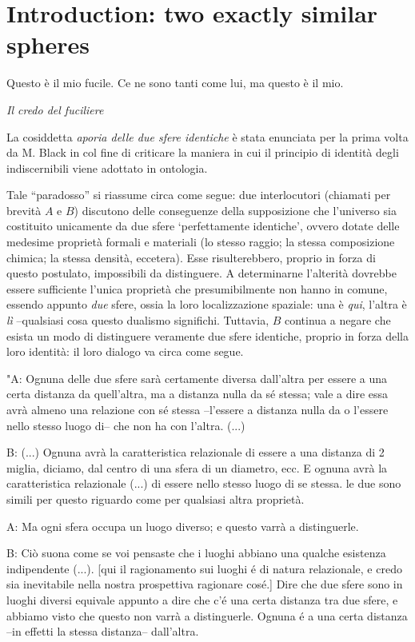 \section{Introduction: two exactly similar spheres}
\epigraph{%
  Questo è il mio fucile. Ce ne sono tanti come lui, ma questo è il mio.
}{\emph{Il credo del fuciliere}}

La cosiddetta \emph{aporia delle due sfere identiche} è stata enunciata per la prima volta da M. Black in \cite{foo} col fine di criticare la maniera in cui il principio di identità degli indiscernibili viene adottato in ontologia.

Tale ``paradosso'' si riassume circa come segue: due interlocutori (chiamati per brevità $A$ e $B$) discutono delle conseguenze della supposizione che l'universo sia costituito unicamente da due sfere `perfettamente identiche', ovvero dotate delle medesime proprietà formali e materiali (lo stesso raggio; la stessa composizione chimica; la stessa densità, eccetera). Esse risulterebbero, proprio in forza di questo postulato, impossibili da distinguere. A determinarne l'alterità dovrebbe essere sufficiente l'unica proprietà che presumibilmente non hanno in comune, essendo appunto \emph{due} sfere, ossia la loro localizzazione spaziale: una è \emph{qui}, l'altra è \emph{lì} --qualsiasi cosa questo dualismo significhi. Tuttavia, $B$ continua a negare che esista un modo di distinguere veramente due sfere identiche, proprio in forza della loro identità: il loro dialogo va circa come segue.

"A: Ognuna delle due sfere sarà certamente diversa dall'altra per essere a una certa distanza da quell'altra, ma a distanza nulla da sé stessa; vale a dire essa avrà almeno una relazione con sé stessa --l'essere a distanza nulla da o l'essere nello stesso luogo di-- che non ha con l'altra. (...)

B: (...) Ognuna avrà la caratteristica relazionale di essere a una distanza di 2 miglia, diciamo, dal centro di una sfera di un diametro, ecc. E ognuna avrà la caratteristica relazionale (...) di essere nello stesso luogo di se stessa. le due sono simili per questo riguardo come per qualsiasi altra proprietà.

A: Ma ogni sfera occupa un luogo diverso; e questo varrà a distinguerle.

B: Ciò suona come se voi pensaste che i luoghi abbiano una qualche esistenza indipendente (...). [qui il ragionamento sui luoghi é di natura relazionale, e credo sia inevitabile nella nostra prospettiva ragionare cos\'e.] Dire che due sfere sono in luoghi diversi equivale appunto a dire che c'é una certa distanza tra due sfere, e abbiamo visto che questo non varrà a distinguerle. Ognuna é a una certa distanza --in effetti la stessa distanza-- dall'altra.

